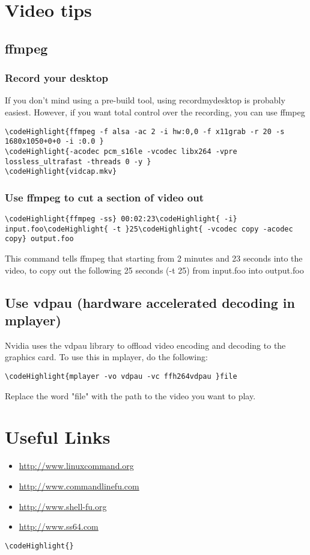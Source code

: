 \documentclass[12pt,a4paper]{article}
\begin{document}
\section{Video tips}
\subsection{ffmpeg}
\subsubsection{Record your desktop}
If you don't mind using a pre-build tool, using recordmydesktop is probably easiest. However, if you want total control over the recording, you can use ffmpeg
\begin{Verbatim}[commandchars=\\\{\}]
\codeHighlight{ffmpeg -f alsa -ac 2 -i hw:0,0 -f x11grab -r 20 -s 1680x1050+0+0 -i :0.0 }
\codeHighlight{-acodec pcm_s16le -vcodec libx264 -vpre lossless_ultrafast -threads 0 -y }
\codeHighlight{vidcap.mkv}
\end{Verbatim}

\subsubsection{Use ffmpeg to cut a section of video out}
\begin{Verbatim}[commandchars=\\\{\}]
\codeHighlight{ffmpeg -ss} 00:02:23\codeHighlight{ -i} input.foo\codeHighlight{ -t }25\codeHighlight{ -vcodec copy -acodec copy} output.foo
\end{Verbatim}
This command tells ffmpeg that starting from 2 minutes and 23 seconds into the video, to copy out the following 25 seconds (-t 25) from input.foo into output.foo

\subsection{Use vdpau (hardware accelerated decoding in mplayer)}
Nvidia uses the vdpau library to offload video encoding and decoding to the graphics card.  To use this in mplayer, do the following:
\begin{Verbatim}[commandchars=\\\{\}]
\codeHighlight{mplayer -vo vdpau -vc ffh264vdpau }file
\end{Verbatim}
Replace the word "file" with the path to the video you want to play.

\section{Useful Links}
\begin{itemize}
\item{\url{http://www.linuxcommand.org}}
\item{\url{http://www.commandlinefu.com}}
\item{\url{http://www.shell-fu.org}}
\item{\url{http://www.ss64.com}}
\end{itemize}
\begin{Verbatim}[commandchars=\\\{\}]
\codeHighlight{}
\end{Verbatim}
\end{document}
